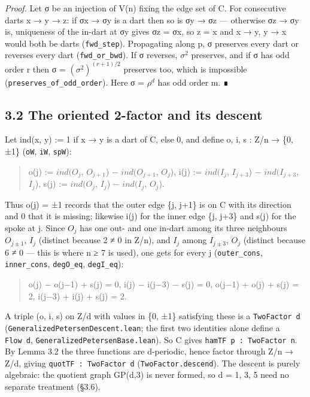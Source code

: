 \documentclass[11pt,a4paper]{article}
\theoremstyle{named}
\begin{document}
\textit{Proof.} Let σ be an injection of V(n) fixing the edge set of C. For consecutive darts x → y → z: if σx → σy is a dart then so is σy → σz — otherwise σz → σy is, uniqueness of the in-dart at σy gives σz = σx, so z = x and x → y, y → x would both be darts (\texttt{fwd\_\allowbreak{}step}). Propagating along p, σ preserves every dart or reverses every dart (\texttt{fwd\_\allowbreak{}or\_\allowbreak{}bwd}). If σ reverses, $σ^2$ preserves, and if σ has odd order r then σ = $(σ^2)^{(r+1)/2}$ preserves too, which is impossible (\texttt{preserves\_\allowbreak{}of\_\allowbreak{}odd\_\allowbreak{}order}). Here σ = $ρ^d$ has odd order m. ∎

\subsection*{3.2 The oriented 2-factor and its descent}
Let ind(x, y) := 1 if x → y is a dart of C, else 0, and define o, i, s : Z/n → \{0, ±1\} (\texttt{oW}, \texttt{iW}, \texttt{spW}):

\begin{quote}
o(j) := $ind(O_j$, $O_{j+1}$) − $ind(O_{j+1}$, $O_j$),  i(j) := $ind(I_j$, $I_{j+3}$) − $ind(I_{j+3}$, $I_j$),  s(j) := $ind(O_j$, $I_j$) − $ind(I_j$, $O_j$).
\end{quote}
Thus o(j) = ±1 records that the outer edge \{j, j+1\} is on C with its direction and 0 that it is missing; likewise i(j) for the inner edge \{j, j+3\} and s(j) for the spoke at j. Since $O_j$ has one out- and one in-dart among its three neighbours $O_{j±1}$, $I_j$ (distinct because 2 ≠ 0 in Z/n), and $I_j$ among $I_{j±3}$, $O_j$ (distinct because 6 ≠ 0 — this is where n ≥ 7 is used), one gets for every j (\texttt{outer\_\allowbreak{}cons}, \texttt{inner\_\allowbreak{}cons}, \texttt{degO\_\allowbreak{}eq}, \texttt{degI\_\allowbreak{}eq}):

\begin{quote}
o(j) − o(j−1) + s(j) = 0,  i(j) − i(j−3) − s(j) = 0,  \textbar{}o(j−1)\textbar{} + \textbar{}o(j)\textbar{} + \textbar{}s(j)\textbar{} = 2,  \textbar{}i(j−3)\textbar{} + \textbar{}i(j)\textbar{} + \textbar{}s(j)\textbar{} = 2.
\end{quote}
A triple (o, i, s) on Z/d with values in \{0, ±1\} satisfying these is a \texttt{TwoFactor\ \allowbreak{}d} (\texttt{GeneralizedPetersenDescent.\allowbreak{}lean}; the first two identities alone define a \texttt{Flow\ \allowbreak{}d}, \texttt{GeneralizedPetersenBase.\allowbreak{}lean}). So C gives \texttt{hamTF\ \allowbreak{}p\ \allowbreak{}:\ \allowbreak{}TwoFactor\ \allowbreak{}n}. By Lemma 3.2 the three functions are d-periodic, hence factor through Z/n → Z/d, giving \texttt{quotTF\ \allowbreak{}:\ \allowbreak{}TwoFactor\ \allowbreak{}d} (\texttt{TwoFactor.\allowbreak{}descend}). The descent is purely algebraic: the quotient graph GP(d,3) is never formed, so d = 1, 3, 5 need no separate treatment (§3.6).
\end{document}
